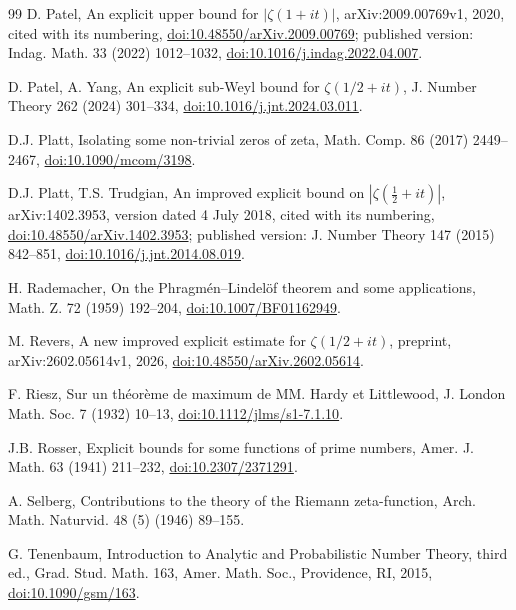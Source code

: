 \documentclass[11pt,a4paper]{article}
\numberwithin{equation}{section}
\theoremstyle{definition}
\theoremstyle{remark}
\begin{document}
\begin{thebibliography}{99}
 D. Patel, An explicit upper bound for $|\zeta(1+it)|$, arXiv:2009.00769v1, 2020, cited with its numbering, \href{https://doi.org/10.48550/arXiv.2009.00769}{doi:10.48550/arXiv.2009.00769}; published version: Indag. Math. 33 (2022) 1012--1032, \href{https://doi.org/10.1016/j.indag.2022.04.007}{doi:10.1016/j.indag.2022.04.007}.

 D. Patel, A. Yang, An explicit sub-Weyl bound for $\zeta(1/2+it)$, J. Number Theory 262 (2024) 301--334, \href{https://doi.org/10.1016/j.jnt.2024.03.011}{doi:10.1016/j.jnt.2024.03.011}.

 D.J. Platt, Isolating some non-trivial zeros of zeta, Math. Comp. 86 (2017) 2449--2467, \href{https://doi.org/10.1090/mcom/3198}{doi:10.1090/mcom/3198}.

 D.J. Platt, T.S. Trudgian, An improved explicit bound on $|\zeta(\frac12+it)|$, arXiv:1402.3953, version dated 4 July 2018, cited with its numbering, \href{https://doi.org/10.48550/arXiv.1402.3953}{doi:10.48550/arXiv.1402.3953}; published version: J. Number Theory 147 (2015) 842--851, \href{https://doi.org/10.1016/j.jnt.2014.08.019}{doi:10.1016/j.jnt.2014.08.019}.

 H. Rademacher, On the Phragm\'en--Lindel\"of theorem and some applications, Math. Z. 72 (1959) 192--204, \href{https://doi.org/10.1007/BF01162949}{doi:10.1007/BF01162949}.

 M. Revers, A new improved explicit estimate for $\zeta(1/2+it)$, preprint, arXiv:2602.05614v1, 2026, \href{https://doi.org/10.48550/arXiv.2602.05614}{doi:10.48550/arXiv.2602.05614}.

 F. Riesz, Sur un th\'eor\`eme de maximum de MM. Hardy et Littlewood, J. London Math. Soc. 7 (1932) 10--13, \href{https://doi.org/10.1112/jlms/s1-7.1.10}{doi:10.1112/jlms/s1-7.1.10}.

 J.B. Rosser, Explicit bounds for some functions of prime numbers, Amer. J. Math. 63 (1941) 211--232, \href{https://doi.org/10.2307/2371291}{doi:10.2307/2371291}.

 A. Selberg, Contributions to the theory of the Riemann zeta-function, Arch. Math. Naturvid. 48 (5) (1946) 89--155.

 G. Tenenbaum, Introduction to Analytic and Probabilistic Number Theory, third ed., Grad. Stud. Math. 163, Amer. Math. Soc., Providence, RI, 2015, \href{https://doi.org/10.1090/gsm/163}{doi:10.1090/gsm/163}.


\end{thebibliography}
\end{document}
